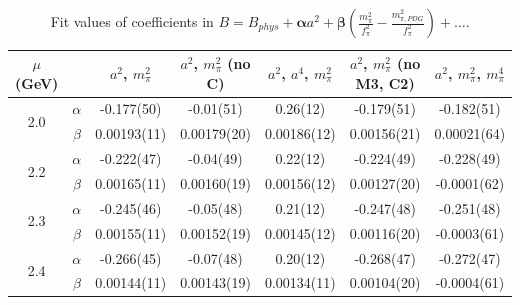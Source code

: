 \documentclass[12pt]{extarticle}
\begin{document}
\begin{table}[h!]
\begin{center}
\begin{tabular}{|c c|c|c|c|c|c|}
\hline
$\mu$ (GeV) &  & $a^2$, $m_\pi^2$& $a^2$, $m_\pi^2$ (no C)& $a^2$, $a^4$, $m_\pi^2$& $a^2$, $m_\pi^2$ (no M3, C2)& $a^2$, $m_\pi^2$, $m_\pi^4$\\
\hline
\multirow{2}{0.5in}{2.0} & $\alpha$ & -0.177(50)& -0.01(51)& 0.26(12)& -0.179(51)& -0.182(51)\\
 & $\beta$ & 0.00193(11)& 0.00179(20)& 0.00186(12)& 0.00156(21)& 0.00021(64)\\
\hline
\multirow{2}{0.5in}{2.2} & $\alpha$ & -0.222(47)& -0.04(49)& 0.22(12)& -0.224(49)& -0.228(49)\\
 & $\beta$ & 0.00165(11)& 0.00160(19)& 0.00156(12)& 0.00127(20)& -0.0001(62)\\
\hline
\multirow{2}{0.5in}{2.3} & $\alpha$ & -0.245(46)& -0.05(48)& 0.21(12)& -0.247(48)& -0.251(48)\\
 & $\beta$ & 0.00155(11)& 0.00152(19)& 0.00145(12)& 0.00116(20)& -0.0003(61)\\
\hline
\multirow{2}{0.5in}{2.4} & $\alpha$ & -0.266(45)& -0.07(48)& 0.20(12)& -0.268(47)& -0.272(47)\\
 & $\beta$ & 0.00144(11)& 0.00143(19)& 0.00134(11)& 0.00104(20)& -0.0004(61)\\
\hline
\end{tabular}
\caption{Fit values of coefficients in $B = B_{phys} + \mathbf{\alpha} a^2 + \mathbf{\beta}\left(\frac{m_\pi^2}{f_\pi^2}-\frac{m_{\pi,PDG}^2}{f_\pi^2}\right) + \ldots$.}
\end{center}
\end{table}




















\clearpage
\end{document}
